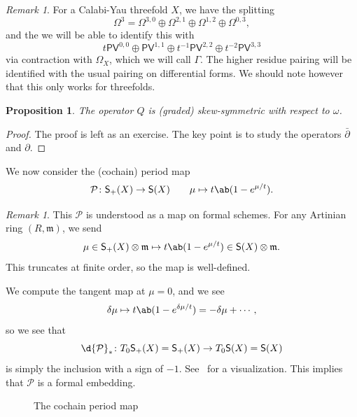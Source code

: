 \documentclass{amsart}
\newtheorem{prop}[thm]{Proposition}
\theoremstyle{definition}
\theoremstyle{remark}
\newtheorem{rmk}[thm]{Remark}
\theoremstyle{plain}
\theoremstyle{definition}
\theoremstyle{remark}
\newcommand{\mc}[1]{\mathcal{#1}}
\newcommand{\mf}[1]{\mathfrak{#1}}
\newcommand{\ms}[1]{\mathsf{#1}}
\newcommand{\1}{\mathbf{1}}
\newcommand{\2}{\mathbf{2}}
\newcommand{\3}{\mathbf{3}}
\newcommand{\dbar}{\bar{\partial}}
\begin{document}
\begin{rmk}
    For a Calabi-Yau threefold \(X\), we have the splitting
    \[ \Omega^3 = \Omega^{3,0} \oplus \Omega^{2,1} \oplus \Omega^{1,2} \oplus \Omega^{0,3}, \]
    and the we will be able to identify this with
    \[ t \ms{PV}^{0,0} \oplus \ms{PV}^{1,1} \oplus t^{-1} \ms{PV}^{2,2} \oplus t^{-2} \ms{PV}^{3,3} \]
    via contraction with \(\Omega_X\), which we will call \(\Gamma\). The higher residue pairing will be identified with the usual pairing on differential forms. We should note however that this only works for threefolds.
\end{rmk}

\begin{prop}
    The operator \(Q\) is (graded) skew-symmetric with respect to \(\omega\).
\end{prop}

\begin{proof}
    The proof is left as an exercise. The key point is to study the operators \(\dbar\) and \(\partial\).
\end{proof}

We now consider the (cochain) period map
\[ \mc{P} \colon \ms{S}_+(X) \to \ms{S}(X) \qquad \mu \mapsto t \ab(1-e^{\mu/t}). \]

\begin{rmk}
    This \(\mc{P}\) is understood as a map on formal schemes. For any Artinian ring \((R, \mf{m})\), we send
    \[ \mu \in \ms{S}_+(X) \otimes \mf{m} \mapsto t \ab(1-e^{\mu/t}) \in \ms{S}(X) \otimes \mf{m}. \]
    This truncates at finite order, so the map is well-defined.
\end{rmk}

We compute the tangent map at \(\mu = 0\), and we see
\[ \delta \mu \mapsto t \ab(1 - e^{\delta \mu/t}) = - \delta \mu + \cdots, \]
so we see that
\[ \d{\mc{P}}_* \colon T_0 \ms{S}_+(X) = \ms{S}_+(X) \to T_0 \ms{S}(X) = \ms{S}(X) \]
is simply the inclusion with a sign of \(-1\). See~ for a visualization. This implies that \(\mc{P}\) is a formal embedding.

\begin{figure}[htpb]
\begin{center}
\end{center}
\caption{The cochain period map}%
\label{fig:cochain-period-map}
\end{figure}
\end{document}

